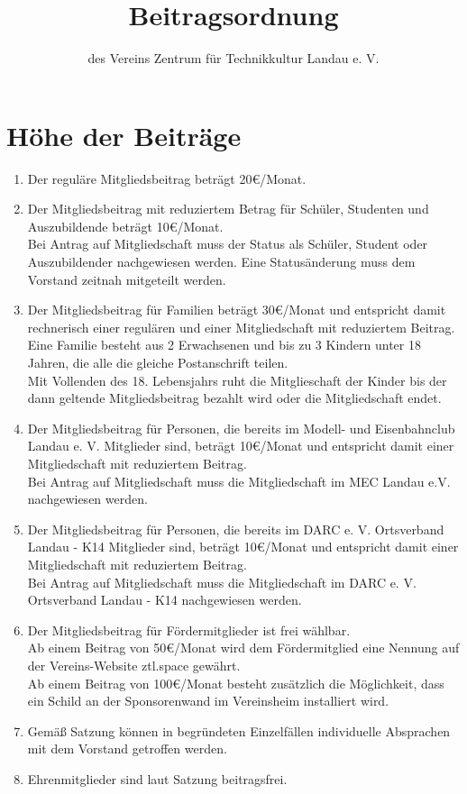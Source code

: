 \documentclass[a4paper, 12pt]{scrartcl}
\begin{document}
\title{Beitragsordnung}
\subtitle{des Vereins Zentrum für Technikkultur Landau e. V.}
\author{}
\date{}

\maketitle

\section{Höhe der Beiträge}
\begin{enumerate}
	\item Der reguläre Mitgliedsbeitrag beträgt 20\euro/Monat.
	\item Der Mitgliedsbeitrag mit reduziertem Betrag für Schüler, Studenten und Auszubildende beträgt 10\euro/Monat.\\ 
	Bei Antrag auf Mitgliedschaft muss der Status als Schüler, Student oder Auszubildender nachgewiesen werden.
	Eine Statusänderung muss dem Vorstand zeitnah mitgeteilt werden.
	\item Der Mitgliedsbeitrag für Familien beträgt 30\euro/Monat und entspricht damit rechnerisch einer regulären und einer Mitgliedschaft mit reduziertem Beitrag. \\ 
Eine Familie besteht aus 2 Erwachsenen und bis zu 3 Kindern unter 18 Jahren, die alle die gleiche Postanschrift teilen.\\
Mit Vollenden des 18. Lebensjahrs ruht die Mitglieschaft der Kinder bis der dann geltende Mitgliedsbeitrag bezahlt wird oder die Mitgliedschaft endet. 
	\item Der Mitgliedsbeitrag für Personen, die bereits im Modell- und Eisenbahnclub Landau e. V. Mitglieder sind, beträgt 10\euro/Monat und entspricht damit einer Mitgliedschaft mit reduziertem Beitrag.\\ Bei Antrag auf Mitgliedschaft muss die Mitgliedschaft im MEC Landau e.V. nachgewiesen werden.
	\item Der Mitgliedsbeitrag für Personen, die bereits im DARC e. V. Ortsverband Landau - K14 Mitglieder sind, beträgt 10\euro/Monat und entspricht damit einer Mitgliedschaft mit reduziertem Beitrag.\\ Bei Antrag auf Mitgliedschaft muss die Mitgliedschaft im DARC e. V. Ortsverband Landau - K14 nachgewiesen werden.
	\item Der Mitgliedsbeitrag für Fördermitglieder ist frei wählbar. \\
	Ab einem Beitrag von 50\euro/Monat wird dem Fördermitglied eine Nennung auf der Vereins-Website ztl.space gewährt. \\
	Ab einem Beitrag von 100\euro/Monat besteht zusätzlich die Möglichkeit, dass ein Schild an der Sponsorenwand im Vereinsheim installiert wird.
	\item Gemäß Satzung können in begründeten Einzelfällen individuelle Absprachen mit dem Vorstand getroffen werden. 
	\item Ehrenmitglieder sind laut Satzung beitragsfrei.
\end{enumerate}
\end{document}
